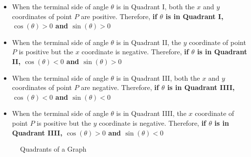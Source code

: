 \begin{itemize}
  \label{item:signs_in_the_4_quadrants}

  \item When the terminal side of angle $\theta$ is in Quadrant I, both the $x$
    and $y$ coordinates of point $P$ are positive. Therefore, \textbf{if
    $\theta$ is in Quadrant I, $\cos(\theta) > 0$ and $\sin(\theta) > 0$}

  \item When the terminal side of angle $\theta$ is in Quadrant II, the $y$
    coordinate of point $P$ is positive but the $x$ coordinate is negative.
    Therefore, \textbf{if $\theta$ is in Quadrant II, $\cos(\theta) < 0$ and
    $\sin(\theta) > 0$}

  \item When the terminal side of angle $\theta$ is in Quadrant III, both the
    $x$ and $y$ coordinates of point $P$ are negative. Therefore, \textbf{if
    $\theta$ is in Quadrant IIII, $\cos(\theta) < 0$ and $\sin(\theta) < 0$}

  \item When the terminal side of angle $\theta$ is in Quadrant IIII, the $x$
    coordinate of point $P$ is positive but the $y$ coordinate is negative.
    Therefore, \textbf{if $\theta$ is in Quadrant IIII, $\cos(\theta) > 0$ and
    $\sin(\theta) < 0$}
\end{itemize}

\begin{figure}[htpb]
  \centering


  \caption{Quadrants of a Graph}
  \label{fig:quadrants}
\end{figure}

